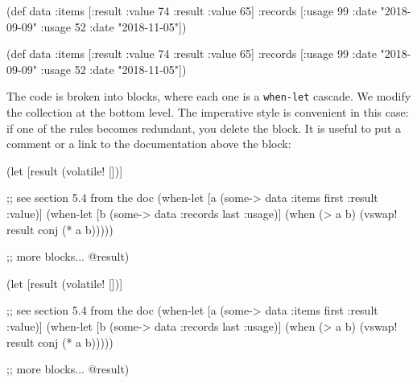 \ifx\DEVICETYPE\MOBILE

\begin{english}
  \begin{clojure}
(def data
  {:items [{:result {:value 74}}
           {:result {:value 65}}]
   :records [{:usage 99
              :date "2018-09-09"}
             {:usage 52
              :date "2018-11-05"}]})
  \end{clojure}
\end{english}

\else

\begin{english}
  \begin{clojure}
(def data
  {:items [{:result {:value 74}}
           {:result {:value 65}}]
   :records [{:usage 99 :date "2018-09-09"}
             {:usage 52 :date "2018-11-05"}]})
  \end{clojure}
\end{english}

\fi

The code is broken into blocks, where each one is a \verb|when-let| cascade. We modify the collection at the bottom level.
The imperative style is convenient in this case: if one of the rules becomes redundant, you delete the block. It is useful to put a comment or a link to the documentation above the block:

\ifx\DEVICETYPE\MOBILE

\begin{english}
  \begin{clojure}
(let [result (volatile! [])]

  ;; see section 5.4 from the doc
  (when-let [a (some-> data
                       :items
                       first
                       :result
                       :value)]
    (when-let [b (some-> data
                       :records
                       last
                       :usage)]
      (when (> a b)
        (vswap! result conj (* a b)))))

  ;; more blocks...
  @result)
  \end{clojure}
\end{english}

\else

\begin{english}
  \begin{clojure}
(let [result (volatile! [])]

  ;; see section 5.4 from the doc
  (when-let [a (some-> data :items first :result :value)]
    (when-let [b (some-> data :records last :usage)]
      (when (> a b)
        (vswap! result conj (* a b)))))

  ;; more blocks...
  @result)
  \end{clojure}
\end{english}

